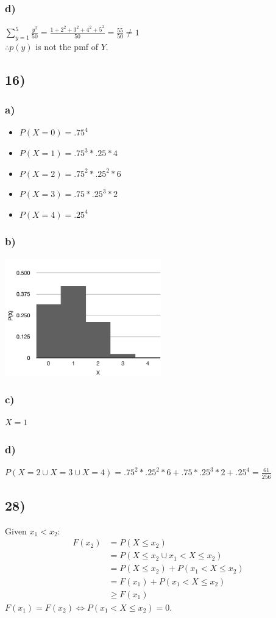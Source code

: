 \documentclass{article}
\begin{document}
		\subsubsection*{d)}
			$\sum_{y=1}^{5} \frac{y^2}{50} = \frac{1+ 2^2 + 3^2 + 4^2 + 5^2}{50} = \frac{55}{50} \not = 1$ \\
			$ \therefore p(y)$ is not the pmf of $Y$.
	\subsection*{16)}
		\subsubsection*{a)}
			\begin{itemize}
				\item $P(X=0) = .75^4$
				\item $P(X=1) = .75^3*.25 * 4$
				\item $P(X=2) = .75^2 * .25^2 *6 $
				\item $P(X=3) = .75 * .25^3 * 2$
				\item $P(X=4) = .25^4$ 
			\end{itemize}
		\subsubsection*{b)}
			\includegraphics[height=2in]{16b}
		\subsubsection*{c)}
			$X=1$
		\subsubsection*{d)}
			$P(X=2 \cup X=3 \cup X=4) = .75^2 * .25^2 *6 +  .75 * .25^3 * 2 +  .25^4 = \frac{61}{256}$
	\subsection*{28)}
		Given $x_1 < x_2$:
		\begin{align}
			F(x_2) &= P(X \leq x_2)\\
			&= P( X \leq x_2 \cup x_1 < X \leq x_2) \\
			&= P( X \leq x_2 ) + P( x_1 < X \leq x_2) \\
			&= F(x_1) + P( x_1 < X \leq x_2)\\
			& \geq F(x_1)
		\end{align}
		$F(x_1) = F(x_2) \iff P(x_1 < X \leq x_2) =0.$
\end{document}
